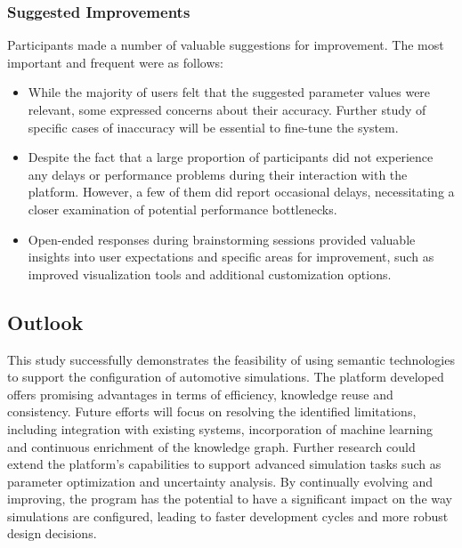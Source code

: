     
    \subsubsection{Suggested Improvements}
    Participants made a number of valuable suggestions for improvement. The most important and frequent were as follows: 
    
    \begin{itemize}
        \item While the majority of users felt that the suggested parameter values were relevant, some expressed concerns about their accuracy. Further study of specific cases of inaccuracy will be essential to fine-tune the system.
    
        \item Despite the fact that a large proportion of participants did not experience any delays or performance problems during their interaction with the platform. However, a few of them did report occasional delays, necessitating a closer examination of potential performance bottlenecks.
    
        \item Open-ended responses during brainstorming sessions provided valuable insights into user expectations and specific areas for improvement, such as improved visualization tools and additional customization options.
    \end{itemize}

\subsection{Outlook}
This study successfully demonstrates the feasibility of using semantic technologies to support the configuration of automotive simulations. The platform developed offers promising advantages in terms of efficiency, knowledge reuse and consistency. Future efforts will focus on resolving the identified limitations, including integration with existing systems, incorporation of machine learning and continuous enrichment of the knowledge graph. Further research could extend the platform's capabilities to support advanced simulation tasks such as parameter optimization and uncertainty analysis. By continually evolving and improving, the program has the potential to have a significant impact on the way simulations are configured, leading to faster development cycles and more robust design decisions.